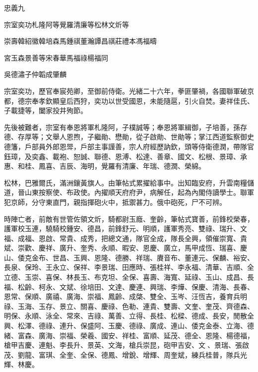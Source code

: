 
\begin{pinyinscope}
忠義九

宗室奕功札隆阿等覺羅清廉等松林文炘等

崇壽韓紹徽韓培森馬鍾祺董瀚譚昌祺莊禮本馮福疇

宮玉森景善等宋春華馬福祿楊福同

吳德潚子仲韜成肇麟

宗室奕功，歷官奉宸苑卿，至御前侍衛。光緒二十六年，拳匪肇禍，各國聯軍破京都，德宗奉孝欽顯皇后西狩，奕功以世受國恩，未能隨扈，引火自焚。妻祥佳氏、子載捷等，闔家投井殉節。

先後被難者，宗室有奉恩將軍札隆阿，子樸誠等；奉恩將軍緝御，子培善，孫存德、存厚等；文舉人恩煦，子繼勛、懋勛，從子啟勛、世勛等；掌江西道監察御史德籓，戶部員外郎恩斝，戶部主事謹善，宗人府經歷訥欽，頭等侍衛德潤，帶隊官鈺璋，及奕鑫、載袍、恕誠、聯德、恩溥、松達、善章、國文、松根、景璋、承惠、和桂、鳳喜、吉辰、海明，覺羅有清廉、年瑞、德潤、榮綿。

松林，巴雅爾氏，滿洲鑲黃旗人。由筆帖式累擢給事中。出知臨安府，升雲南糧儲道，晉山東按察使、布政使。內擢順天府府尹，病解任，起為內閣侍讀學士。聯軍犯京師，分守東直門，親指揮砲火中，抵禦甚力。俄中砲死，尸不可辨。

時陣亡者，前敵有世管佐領文炘，騎都尉玉廕、奎齡，筆帖式寶善，前鋒校榮春，護軍校玉連，驍騎校鍾安、德昌，前鋒舒元、明順，護軍秀亮、雙祿、瑞升、文福、成福、恩啟、常貴、成秀，把總文通，隊官全成，隊長全興，領催崇寬、貴斌、崇歡、慶祥、廣升、奎秀、永順、暇安、恩慶、廣立，馬甲成恆、瑞喜、慶山、倭克金布、世昌、玉興、恩隆、德勝、祥瑞、賡音布、董連元、保麟、裕安、長泉、保玲、王永立、保祥、李景瑞、田應時、張桂祥、李永福、清華、吉順、全立德、玉崇、喜保、林長玉、布克坦、全保、喜壽、海寬、延祿、玉山、成昌、長福、松齡、柯永、文斌、徐培田、文達、慶連、興瑞、李燁、保慶、清海、長春、恩常、保順、廣禧、廣海、崇福、鳳齡、成棨、雙全、玉岑、汪恆吉，養育兵明祿、玉海、玉存、景立、關喜、慶祿、色勒、連貴、雙壽、文奎、奎茂、齊德森、明保、永順、泳全、常來、吉祿、萬善、立得、長桂、松樑、德成、長安，閒散全興、松澤、德祿、連升、保盛阿、玉慶、德祿、廣成、連山、倭克金泰、立海、德緒、富森、廣海、崇福、榮羲、國安、祥桂、富順、延茂、德全、恩隆、楊德福，槍甲吉慶、連魁、李長升、景英、文海，槍兵崇昆，砲甲吉安、文、景瑞、張啟茂、劉龍、富琪、全奎、全保、德鳳、增銳、增輝、周奎斌，練兵桂普，隊兵光輝、林慶。


\end{pinyinscope}
